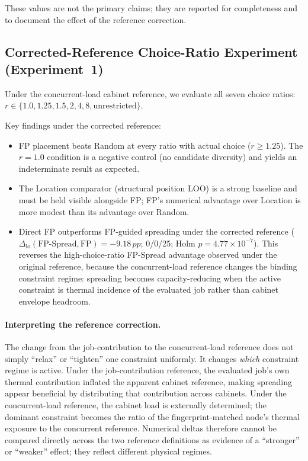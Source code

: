 \documentclass[acmsmall,screen,review,anonymous]{acmart}
\newcommand{\dlo}{\ensuremath{\Delta_{\mathrm{lo}}}\xspace}
\newcommand{\pp}{\,pp\xspace}
\begin{document}
These values are not the primary claims; they are reported for completeness and to
document the effect of the reference correction.

\subsection{Corrected-Reference Choice-Ratio Experiment (Experiment~1)}
\label{sec:exp1}

Under the concurrent-load cabinet reference, we evaluate all seven choice ratios:
$r \in \{1.0, 1.25, 1.5, 2, 4, 8, \text{unrestricted}\}$.


Key findings under the corrected reference:
\begin{itemize}
  \item FP placement beats Random at every ratio with actual choice ($r \geq 1.25$).
    The $r = 1.0$ condition is a negative control (no candidate diversity) and
    yields an indeterminate result as expected.
  \item The Location comparator (structural position LOO) is a strong baseline and
    must be held visible alongside FP; FP's numerical advantage over Location is more
    modest than its advantage over Random.
  \item Direct FP outperforms FP-guided spreading under the corrected reference
    ($\dlo(\text{FP-Spread},\text{FP}) = -9.18\pp$; 0/0/25; Holm $p = 4.77\times10^{-7}$).
    This reverses the high-choice-ratio FP-Spread advantage observed under the original
    reference, because the concurrent-load reference changes the binding constraint
    regime: spreading becomes capacity-reducing when the active constraint is thermal
    incidence of the evaluated job rather than cabinet envelope headroom.
\end{itemize}

\paragraph{Interpreting the reference correction.}
The change from the job-contribution to the concurrent-load reference does not simply
``relax'' or ``tighten'' one constraint uniformly.  It changes \emph{which} constraint
regime is active.  Under the job-contribution reference, the evaluated job's own thermal
contribution inflated the apparent cabinet reference, making spreading appear beneficial
by distributing that contribution across cabinets.  Under the concurrent-load reference,
the cabinet load is externally determined; the dominant constraint becomes the ratio of
the fingerprint-matched node's thermal exposure to the concurrent reference.  Numerical
deltas therefore cannot be compared directly across the two reference definitions as
evidence of a ``stronger'' or ``weaker'' effect; they reflect different physical regimes.
\end{document}
